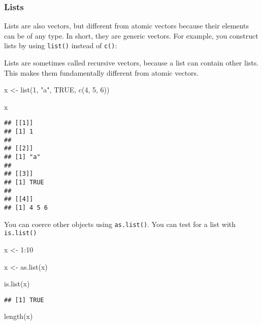 \documentclass[
]{book}
\newenvironment{Shaded}{\begin{snugshade}}{\end{snugshade}}
\newcommand{\ConstantTok}[1]{\textcolor[rgb]{0.00,0.00,0.00}{#1}}
\newcommand{\DecValTok}[1]{\textcolor[rgb]{0.00,0.00,0.81}{#1}}
\newcommand{\FunctionTok}[1]{\textcolor[rgb]{0.00,0.00,0.00}{#1}}
\newcommand{\NormalTok}[1]{#1}
\newcommand{\OtherTok}[1]{\textcolor[rgb]{0.56,0.35,0.01}{#1}}
\newcommand{\SpecialCharTok}[1]{\textcolor[rgb]{0.00,0.00,0.00}{#1}}
\newcommand{\StringTok}[1]{\textcolor[rgb]{0.31,0.60,0.02}{#1}}
\begin{document}
\hypertarget{lists}{%
\subsubsection{Lists}\label{lists}}

Lists are also vectors, but different from atomic vectors because their elements can be of any type. In short, they are generic vectors. For example, you construct lists by using \texttt{list()} instead of \texttt{c()}:

Lists are sometimes called recursive vectors, because a list can contain other lists. This makes them fundamentally different from atomic vectors.

\begin{Shaded}
\begin{Highlighting}[]
\NormalTok{x }\OtherTok{\textless{}{-}} \FunctionTok{list}\NormalTok{(}\DecValTok{1}\NormalTok{, }\StringTok{"a"}\NormalTok{, }\ConstantTok{TRUE}\NormalTok{, }\FunctionTok{c}\NormalTok{(}\DecValTok{4}\NormalTok{, }\DecValTok{5}\NormalTok{, }\DecValTok{6}\NormalTok{))}

\NormalTok{x}
\end{Highlighting}
\end{Shaded}

\begin{verbatim}
## [[1]]
## [1] 1
## 
## [[2]]
## [1] "a"
## 
## [[3]]
## [1] TRUE
## 
## [[4]]
## [1] 4 5 6
\end{verbatim}

You can coerce other objects using \texttt{as.list()}. You can test for a list with \texttt{is.list()}

\begin{Shaded}
\begin{Highlighting}[]
\NormalTok{x }\OtherTok{\textless{}{-}} \DecValTok{1}\SpecialCharTok{:}\DecValTok{10}

\NormalTok{x }\OtherTok{\textless{}{-}} \FunctionTok{as.list}\NormalTok{(x)}

\FunctionTok{is.list}\NormalTok{(x)}
\end{Highlighting}
\end{Shaded}

\begin{verbatim}
## [1] TRUE
\end{verbatim}

\begin{Shaded}
\begin{Highlighting}[]
\FunctionTok{length}\NormalTok{(x)}
\end{Highlighting}
\end{Shaded}
\end{document}
